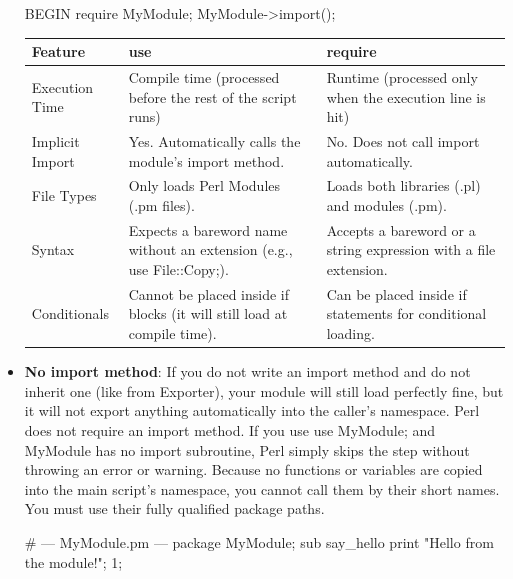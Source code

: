 \documentclass{report}
\begin{document}
\begin{itemize}
            \bigbreak \noindent 
            \begin{perlcode}
                BEGIN {
                    require MyModule;
                    MyModule->import();
                }
            \end{perlcode}
            \begin{center}
                \begin{tabularx}{\textwidth}{@{}lXX@{}}
                    \toprule
                    \textbf{Feature}& \textbf{use}& \textbf{require} \\
                    \midrule
                    Execution Time & Compile time (processed before the rest of the script runs) &Runtime (processed only when the execution line is hit)\\[2ex]
                    Implicit Import & Yes. Automatically calls the module's import method. &No. Does not call import automatically.\\[2ex]
                    File Types & Only loads Perl Modules (.pm files). & Loads both libraries (.pl) and modules (.pm). \\[2ex]
                    Syntax & Expects a bareword name without an extension (e.g., use File::Copy;). &Accepts a bareword or a string expression with a file extension.\\[2ex]
                    Conditionals & Cannot be placed inside if blocks (it will still load at compile time). &Can be placed inside if statements for conditional loading. \\
                    \bottomrule
                \end{tabularx}
            \end{center}
        \item \textbf{No import method}: If you do not write an import method and do not inherit one (like from Exporter), your module will still load perfectly fine, but it will not export anything automatically into the caller's namespace.
            \bigbreak \noindent 
            Perl does not require an import method. If you use use MyModule; and MyModule has no import subroutine, Perl simply skips the step without throwing an error or warning.
            \bigbreak \noindent 
            Because no functions or variables are copied into the main script's namespace, you cannot call them by their short names. You must use their fully qualified package paths.
            \bigbreak \noindent 
            \begin{perlcode}
                # --- MyModule.pm ---
                package MyModule;
                sub say_hello {
                    print "Hello from the module!\n";
                }
                1;


\end{perlcode}
\end{itemize}
\end{document}
